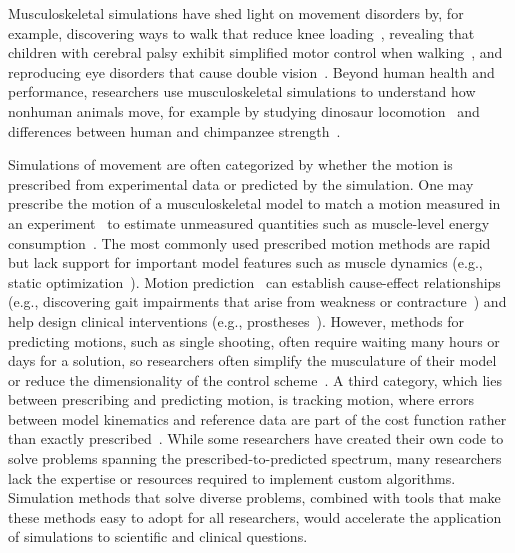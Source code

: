 \documentclass[10pt,letterpaper]{article}
\begin{document}
Musculoskeletal simulations have shed light on movement disorders by, for example, discovering ways to walk that reduce knee loading~\cite{Fregly:2007ac}, revealing that children with cerebral palsy exhibit simplified motor control when walking~\cite{Steele:2015}, and reproducing eye disorders that cause double vision~\cite{Priamikov:2016}. Beyond human health and performance, researchers use musculoskeletal simulations to understand how nonhuman animals move, for example by studying dinosaur locomotion~\cite{sthaya:2005uk} and differences between human and chimpanzee strength~\cite{ONeill:2017}.

Simulations of movement are often categorized by whether the motion is prescribed from experimental data or predicted by the simulation. One may prescribe the motion of a musculoskeletal model to match a motion measured in an experiment~\cite{Thelen:2003bba,Lloyd:2003} to estimate unmeasured quantities such as muscle-level energy consumption~\cite{Farris:2014du,Jackson:2017go}. The most commonly used prescribed motion methods are rapid but lack support for important model features such as muscle dynamics (e.g., static optimization~\cite{Prilutsky:2002}).
Motion prediction~\cite{Geijtenbeek:2019} can establish cause-effect relationships (e.g., discovering gait impairments that arise from weakness or contracture~\cite{Ong:2019}) and help design clinical interventions (e.g., prostheses~\cite{Handford:2016kd}).
However, methods for predicting motions, such as single shooting,  often require waiting many hours or days for a solution, so researchers often simplify the musculature of their model or reduce the dimensionality of the control scheme~\cite{Anderson:2001gv,Ong:2019}.
A third category, which lies between prescribing and predicting motion, is tracking motion, where errors between model kinematics and reference data are part of the cost function rather than exactly prescribed~\cite{Lin:2017jp}.
While some researchers have created their own code to solve problems spanning the prescribed-to-predicted spectrum, many researchers lack the expertise or resources required to implement custom algorithms.
Simulation methods that solve diverse problems, combined with tools that make these methods easy to adopt for all researchers, would accelerate the application of simulations to scientific and clinical questions.
\end{document}
